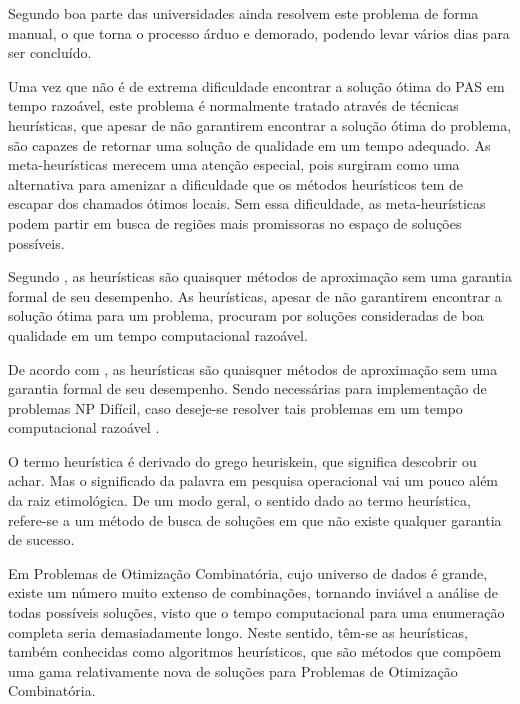 Segundo \cite{souza2000} boa parte das universidades ainda resolvem este problema de forma manual, o que torna o processo árduo e demorado, podendo levar vários dias para ser concluído.\par

Uma vez que não é de extrema dificuldade encontrar a solução ótima do PAS em tempo razoável, este problema é normalmente tratado através de técnicas heurísticas, que apesar de não garantirem encontrar a solução ótima do problema, são capazes de retornar uma solução de qualidade em um tempo adequado. As meta-heurísticas merecem uma atenção especial, pois surgiram como uma alternativa para amenizar a dificuldade que os métodos heurísticos tem de escapar dos chamados ótimos locais. Sem essa dificuldade, as meta-heurísticas podem partir em busca de regiões mais promissoras no espaço de soluções possíveis.\cite{alguem}\par




Segundo \cite{steiglitz1982combinatorial}, as heurísticas são quaisquer métodos de 
aproximação sem uma garantia formal de seu desempenho. As heurísticas, apesar de não garantirem encontrar a solução ótima para um problema, procuram por soluções consideradas de boa qualidade em um tempo computacional razoável.\par

De acordo com \cite{steiglitz1982combinatorial}, as heurísticas são quaisquer métodos de aproximação sem uma garantia formal de seu desempenho. Sendo necessárias para implementação de problemas NP Difícil, caso deseje-se resolver tais problemas em um tempo computacional razoável \cite{evans1992optimization}.\par

O termo heurística é derivado do grego heuriskein, que significa descobrir ou achar. Mas o significado da 
palavra em pesquisa operacional vai um pouco além da raiz etimológica. De um modo geral, o sentido dado ao termo heurística, refere-se a um método de busca de soluções em que não existe qualquer garantia de sucesso.\par


\cite{deleonardo} Em Problemas de Otimização Combinatória, cujo universo de dados é grande, existe um número muito extenso de combinações, tornando inviável a análise de todas possíveis soluções, visto que o tempo computacional para uma enumeração completa seria demasiadamente longo. Neste sentido, têm-se as heurísticas, também conhecidas como algoritmos heurísticos, que são métodos que compõem uma gama relativamente nova de soluções para Problemas de Otimização Combinatória. 


